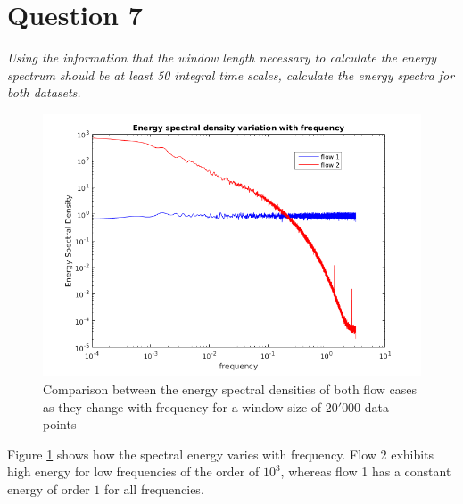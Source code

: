 \section*{Question 7}
\textit{Using the information that the window length necessary to calculate the energy spectrum should be at least 50 integral time scales, calculate the energy spectra for both datasets.}

\begin{figure}[ht]
\centering
\includegraphics[scale=0.7]{./TEXT/esd.png}
\caption{Comparison between the energy spectral densities of both flow cases as they change with frequency for a window size of $20'000$ data points}
\label{esd}
\end{figure}

Figure \ref{esd} shows how the spectral energy varies with frequency. Flow 2 exhibits high energy for low frequencies of the order of $10^{3}$, whereas flow 1 has a constant energy of order $1$ for all frequencies.
